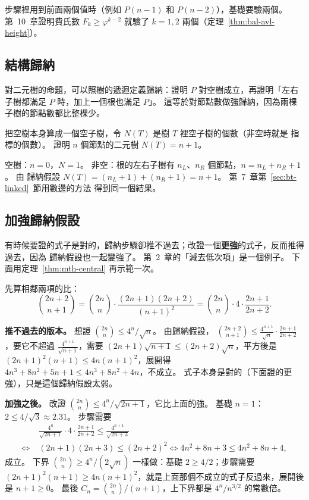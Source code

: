 步驟裡用到前面兩個值時（例如 $P(n-1)$ 和 $P(n-2)$），基礎要驗兩個。 第~10~章證明費氏數
$F_k \ge \varphi^{k-2}$ 就驗了 $k = 1, 2$ 兩個（定理~\ref{thm:bal-avl-height}）。

\subsection{結構歸納}

對二元樹的命題，可以照樹的遞迴定義歸納：證明 $P$ 對空樹成立，再證明「左右子樹都滿足 $P$
時，加上一個根也滿足 $P$」。 這等於對節點數做強歸納，因為兩棵子樹的節點數都比整棵少。

把空樹本身算成一個空子樹，令 $N(T)$ 是樹 $T$ 裡空子樹的個數（非空時就是
\NIL 指標的個數）。 證明 $n$ 個節點的二元樹 $N(T) = n + 1$。

空樹：$n = 0$，$N = 1$。 非空：根的左右子樹有 $n_L$、$n_R$ 個節點，$n = n_L + n_R + 1$。 由
歸納假設 $N(T) = (n_L + 1) + (n_R + 1) = n + 1$。 第~7~章第~\ref{sec:bt-linked}~節用數邊的方法
得到同一個結果。

\subsection{加強歸納假設}

有時候要證的式子是對的，歸納步驟卻推不過去；改證一個\textbf{更強}的式子，反而推得過去，因為
歸納假設也一起變強了。 第~2~章的「減去低次項」是一個例子。 下面用定理~\ref{thm:mth-central}
再示範一次。

先算相鄰兩項的比：
\[
\binom{2n+2}{n+1} = \binom{2n}{n} \cdot \frac{(2n+1)(2n+2)}{(n+1)^2}
= \binom{2n}{n} \cdot 4 \cdot \frac{2n+1}{2n+2}.
\]

\textbf{推不過去的版本。} 想證 $\binom{2n}{n} \le 4^n / \sqrt{n}$。 由歸納假設，
$\binom{2n+2}{n+1} \le \frac{4^{n+1}}{\sqrt n} \cdot \frac{2n+1}{2n+2}$，要它不超過
$\frac{4^{n+1}}{\sqrt{n+1}}$，需要 $(2n+1)\sqrt{n+1} \le (2n+2)\sqrt{n}$，平方後是
$(2n+1)^2(n+1) \le 4n(n+1)^2$，展開得 $4n^3 + 8n^2 + 5n + 1 \le 4n^3 + 8n^2 + 4n$，不成立。
式子本身是對的（下面證的更強），只是這個歸納假設太弱。

\textbf{加強之後。} 改證 $\binom{2n}{n} \le 4^n / \sqrt{2n+1}$，它比上面的強。 基礎
$n = 1$：$2 \le 4/\sqrt{3} \approx 2.31$。 步驟需要
\begin{align*}
&\frac{4^n}{\sqrt{2n+1}} \cdot 4 \cdot \frac{2n+1}{2n+2} \le \frac{4^{n+1}}{\sqrt{2n+3}} \\
\iff\; &(2n+1)(2n+3) \le (2n+2)^2
\iff 4n^2 + 8n + 3 \le 4n^2 + 8n + 4,
\end{align*}
成立。 下界 $\binom{2n}{n} \ge 4^n / (2\sqrt n)$ 一樣做：基礎 $2 \ge 4/2$；步驟需要
$(2n+1)^2(n+1) \ge 4n(n+1)^2$，就是上面那個不成立的式子反過來，展開後是 $n + 1 \ge 0$。
最後 $C_n = \binom{2n}{n}/(n+1)$，上下界都是 $4^n / n^{3/2}$ 的常數倍。


